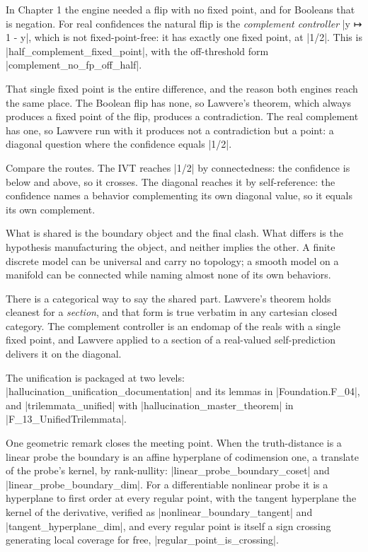 \documentclass{memoir}
\begin{document}
In Chapter 1 the engine needed a flip with no fixed point, and for Booleans that
is negation. For real confidences the natural flip is the \emph{complement
controller} \LeanVerb|y ↦ 1 - y|, which is not fixed-point-free: it has exactly one fixed
point, at \LeanVerb|1/2|. This is \LeanVerb|half_complement_fixed_point|, with the off-threshold
form \LeanVerb|complement_no_fp_off_half|.

That single fixed point is the entire difference, and the reason both engines
reach the same place. The Boolean flip has none, so Lawvere's theorem, which
always produces a fixed point of the flip, produces a contradiction. The real
complement has one, so Lawvere run with it produces not a contradiction but a
point: a diagonal question where the confidence equals \LeanVerb|1/2|.

Compare the routes. The IVT reaches \LeanVerb|1/2| by connectedness: the confidence is
below and above, so it crosses. The diagonal reaches it by self-reference: the
confidence names a behavior complementing its own diagonal value, so it equals
its own complement.

What is shared is the boundary object and the final clash. What differs is the
hypothesis manufacturing the object, and neither implies the other. A finite
discrete model can be universal and carry no topology; a smooth model on a
manifold can be connected while naming almost none of its own behaviors.

There is a categorical way to say the shared part. Lawvere's theorem holds
cleanest for a \emph{section}, and that form is true verbatim in any cartesian closed
category. The complement controller is an endomap of the reals with a single
fixed point, and Lawvere applied to a section of a real-valued self-prediction
delivers it on the diagonal.

The unification is packaged at two levels:
\LeanVerb|hallucination_unification_documentation| and its lemmas in \LeanVerb|Foundation.F_04|,
and \LeanVerb|trilemmata_unified| with \LeanVerb|hallucination_master_theorem| in
\LeanVerb|F_13_UnifiedTrilemmata|.

One geometric remark closes the meeting point. When the truth-distance is a
linear probe the boundary is an affine hyperplane of codimension one, a
translate of the probe's kernel, by rank-nullity: \LeanVerb|linear_probe_boundary_coset|
and \LeanVerb|linear_probe_boundary_dim|. For a differentiable nonlinear probe it is a
hyperplane to first order at every regular point, with the tangent hyperplane
the kernel of the derivative, verified as \LeanVerb|nonlinear_boundary_tangent| and
\LeanVerb|tangent_hyperplane_dim|, and every regular point is itself a sign crossing
generating local coverage for free, \LeanVerb|regular_point_is_crossing|.
\end{document}

